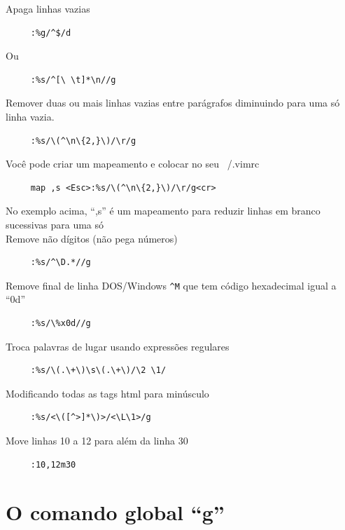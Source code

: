 \documentclass[10pt,a4paper,openany]{book}
\begin{document}
Apaga linhas vazias

\begin{verbatim}
     :%g/^$/d
\end{verbatim}

Ou

\begin{verbatim}
     :%s/^[\ \t]*\n//g
\end{verbatim}

Remover duas ou mais linhas vazias entre parágrafos diminuindo para
uma só linha vazia.

\begin{verbatim}
     :%s/\(^\n\{2,}\)/\r/g
\end{verbatim}

Você pode criar um mapeamento e colocar no seu ~/.vimrc

\begin{verbatim}
     map ,s <Esc>:%s/\(^\n\{2,}\)/\r/g<cr>
\end{verbatim}

No exemplo acima, ``,s'' é um mapeamento para reduzir linhas em branco
sucessivas para uma só  \\


Remove não dígitos (não pega números)

\begin{verbatim}
     :%s/^\D.*//g
\end{verbatim}

Remove final de linha DOS/Windows \verb|^M| que tem código hexadecimal igual a
``0d''

\begin{verbatim}
     :%s/\%x0d//g
\end{verbatim}

Troca palavras de lugar usando expressões regulares

\begin{verbatim}
     :%s/\(.\+\)\s\(.\+\)/\2 \1/
\end{verbatim}

Modificando todas as tags html para minúsculo

\begin{verbatim}
     :%s/<\([^>]*\)>/<\L\1>/g
\end{verbatim}

Move linhas 10 a 12 para além da linha 30

\begin{verbatim}
     :10,12m30
\end{verbatim}

\section{O comando global ``g''}\label{sec:O comando global ``g''}
\end{document}
